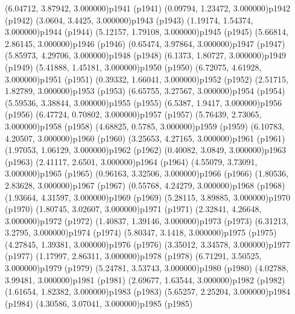 \psPoint(6.04712, 3.87942, 3.000000){p1941}
\psdot(p1941)
\psPoint(0.09794, 1.23472, 3.000000){p1942}
\psdot(p1942)
\psPoint(3.0604, 3.4425, 3.000000){p1943}
\psdot(p1943)
\psPoint(1.19174, 1.54374, 3.000000){p1944}
\psdot(p1944)
\psPoint(5.12157, 1.79108, 3.000000){p1945}
\psdot(p1945)
\psPoint(5.66814, 2.86145, 3.000000){p1946}
\psdot(p1946)
\psPoint(0.65474, 3.97864, 3.000000){p1947}
\psdot(p1947)
\psPoint(5.85973, 4.29706, 3.000000){p1948}
\psdot(p1948)
\psPoint(6.1373, 1.80727, 3.000000){p1949}
\psdot(p1949)
\psPoint(5.41888, 1.45181, 3.000000){p1950}
\psdot(p1950)
\psPoint(6.72075, 4.61928, 3.000000){p1951}
\psdot(p1951)
\psPoint(0.39332, 1.66041, 3.000000){p1952}
\psdot(p1952)
\psPoint(2.51715, 1.82789, 3.000000){p1953}
\psdot(p1953)
\psPoint(6.65755, 3.27567, 3.000000){p1954}
\psdot(p1954)
\psPoint(5.59536, 3.38844, 3.000000){p1955}
\psdot(p1955)
\psPoint(6.5387, 1.9417, 3.000000){p1956}
\psdot(p1956)
\psPoint(6.47724, 0.70802, 3.000000){p1957}
\psdot(p1957)
\psPoint(5.76439, 2.73065, 3.000000){p1958}
\psdot(p1958)
\psPoint(4.68825, 0.5785, 3.000000){p1959}
\psdot(p1959)
\psPoint(6.10783, 4.20507, 3.000000){p1960}
\psdot(p1960)
\psPoint(3.25653, 4.27165, 3.000000){p1961}
\psdot(p1961)
\psPoint(1.97053, 1.06129, 3.000000){p1962}
\psdot(p1962)
\psPoint(0.40082, 3.0849, 3.000000){p1963}
\psdot(p1963)
\psPoint(2.41117, 2.6501, 3.000000){p1964}
\psdot(p1964)
\psPoint(4.55079, 3.73091, 3.000000){p1965}
\psdot(p1965)
\psPoint(0.96163, 3.32506, 3.000000){p1966}
\psdot(p1966)
\psPoint(1.80536, 2.83628, 3.000000){p1967}
\psdot(p1967)
\psPoint(0.55768, 4.24279, 3.000000){p1968}
\psdot(p1968)
\psPoint(1.93664, 4.31597, 3.000000){p1969}
\psdot(p1969)
\psPoint(5.28115, 3.89885, 3.000000){p1970}
\psdot(p1970)
\psPoint(1.80745, 3.02607, 3.000000){p1971}
\psdot(p1971)
\psPoint(2.32841, 4.26648, 3.000000){p1972}
\psdot(p1972)
\psPoint(1.40837, 1.39146, 3.000000){p1973}
\psdot(p1973)
\psPoint(6.31213, 3.2795, 3.000000){p1974}
\psdot(p1974)
\psPoint(5.80347, 3.1418, 3.000000){p1975}
\psdot(p1975)
\psPoint(4.27845, 1.39381, 3.000000){p1976}
\psdot(p1976)
\psPoint(3.35012, 3.34578, 3.000000){p1977}
\psdot(p1977)
\psPoint(1.17997, 2.86311, 3.000000){p1978}
\psdot(p1978)
\psPoint(6.71291, 3.50525, 3.000000){p1979}
\psdot(p1979)
\psPoint(5.24781, 3.53743, 3.000000){p1980}
\psdot(p1980)
\psPoint(4.02788, 3.99481, 3.000000){p1981}
\psdot(p1981)
\psPoint(2.69677, 1.63544, 3.000000){p1982}
\psdot(p1982)
\psPoint(1.61654, 1.82382, 3.000000){p1983}
\psdot(p1983)
\psPoint(5.65257, 2.25204, 3.000000){p1984}
\psdot(p1984)
\psPoint(4.30586, 3.07041, 3.000000){p1985}
\psdot(p1985)
